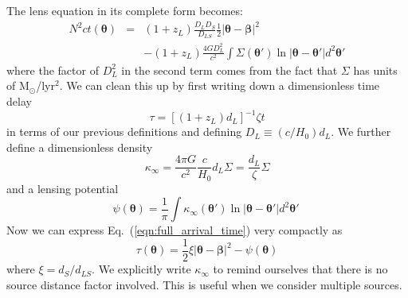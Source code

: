 \documentclass[galley,usenatbib]{mn2e}
\newcommand{\Rmap}{\ensuremath{R_\mathrm{map}}}
\newcommand{\Rpix}{\ensuremath{R_\mathrm{pix}}}
\newcommand{\Msun}{\ensuremath{\mathrm{M}_\odot}}
\newcommand{\figref}[1] {Figure~\ref{#1}}
\newcommand{\eqnref}[1] {Eq.~(\ref{#1})}
\renewcommand{\vec}[1]{\ensuremath{\boldsymbol{#1}}}
\newcommand\plottwo[2]{{%
 \centering
 \leavevmode
 \columnwidth=.45\columnwidth
 \texttt{[image: \#1]}%
 \hfil
 \texttt{[image: \#2]}%
}}%
\begin{document}
The lens equation in its complete form becomes:
%
\begin{eqnarray}
N^2ct(\vec\theta) & = & (1+z_L)\frac{D_{L}D_{S}}{D_{LS}}\frac12 |\vec\theta - \vec\beta|^2 \nonumber \\
& & - (1+z_L)\frac{4GD_{L}^2}{c^2}\int \Sigma(\vec\theta') \ln |\vec\theta-\vec\theta'| d^2\vec\theta'
\label{eqn:full_arrival_time}
\end{eqnarray}
%
where the factor of $D_L^2$ in the second term comes from the fact that $\Sigma$
has units of \Msun/lyr$^2$. We can clean this up by first writing down a dimensionless time
delay
%
\begin{equation}
\tau = \left[ (1+z_L) d_L\right]^{-1}\zeta t
\label{tau}
\end{equation}
%
in terms of our previous definitions and defining $D_L \equiv (c/H_0)d_L$. We
further define a dimensionless density
%
\begin{equation}
\kappa_\infty = \frac{4\pi G}{c^2}\frac{c}{H_0}d_L\Sigma
              = \frac{d_L}{\zeta}\Sigma
\end{equation}
%
and a lensing potential
%
\begin{equation}
\psi(\vec\theta) = \frac1\pi \int \kappa_\infty(\vec\theta') \ln|\vec\theta - \vec\theta'| d^2\vec\theta'\
\label{lensing potential}
\end{equation}
%
Now we can express \eqnref{eqn:full_arrival_time} very compactly as
%
\begin{equation}
\tau(\vec\theta) = \frac12 \xi |\vec\theta-\vec\beta|^2 - \psi(\vec\theta)
\label{arrival time}
\end{equation}
%
where $\xi=d_S / d_{LS}$.
We explicitly write $\kappa_\infty$ to remind ourselves
that there is no source distance factor involved. This is useful when we
consider multiple sources.

%
\end{document}
